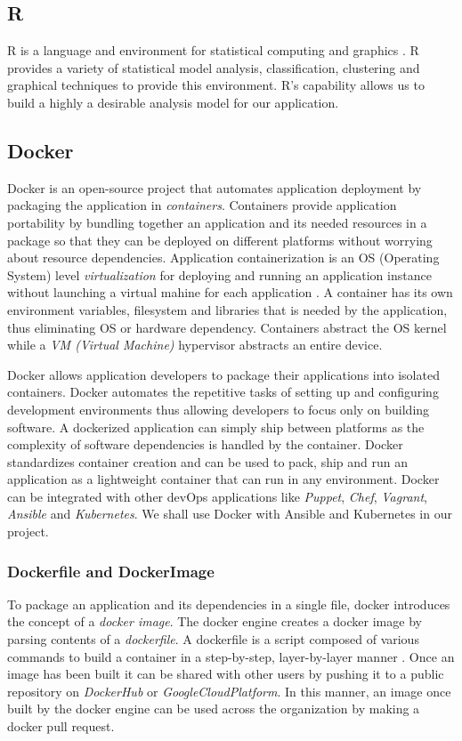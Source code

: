\documentclass[9pt,twocolumn,twoside]{../../styles/osajnl}
\begin{document}
\subsection{R}
R is a language and environment for statistical computing and graphics
\cite{www-about-rproject}. R provides a variety of statistical model
analysis, classification, clustering and graphical techniques to
provide this environment. R's capability allows us to build a highly a
desirable analysis model for our application.


\subsection{Docker}

Docker is an open-source project that automates application deployment
by packaging the application in \emph{containers}. Containers provide
application portability by bundling together an application and its
needed resources in a package so that they can be deployed on
different platforms without worrying about resource
dependencies. Application containerization is an OS (Operating System)
level \emph{virtualization} \cite{www-virtualization-wiki} for
deploying and running an application instance without launching a
virtual mahine for each application \cite{www-containerization}. A
container has its own environment variables, filesystem and libraries
that is needed by the application, thus eliminating OS or hardware
dependency. Containers abstract the OS kernel while a \emph{VM
  (Virtual Machine)} \cite{www-virtualmachine-wiki} hypervisor
abstracts an entire device.

\noindent
Docker allows application developers to package their applications
into isolated containers. Docker automates the repetitive tasks of
setting up and configuring development environments thus allowing
developers to focus only on building software. A dockerized
application can simply ship between platforms as the complexity of
software dependencies is handled by the container. Docker standardizes
container creation and can be used to pack, ship and run an
application as a lightweight container that can run in any
environment. Docker can be integrated with other devOps applications
like \emph{Puppet}, \emph{Chef}, \emph{Vagrant}, \emph{Ansible} and
\emph{Kubernetes}. We shall use Docker with Ansible and Kubernetes in
our project.

\subsubsection{Dockerfile and DockerImage}
To package an application and its dependencies in a single file,
docker introduces the concept of a \emph{docker image}. The docker
engine creates a docker image by parsing contents of a
\emph{dockerfile}. A dockerfile is a script composed of various
commands to build a container in a step-by-step, layer-by-layer manner
\cite{www-docker-digitalocean}. Once an image has been built it can be
shared with other users by pushing it to a public repository on
\emph{DockerHub} or \emph{GoogleCloudPlatform}. In this manner, an
image once built by the docker engine can be used across the
organization by making a docker pull request.
\end{document}
